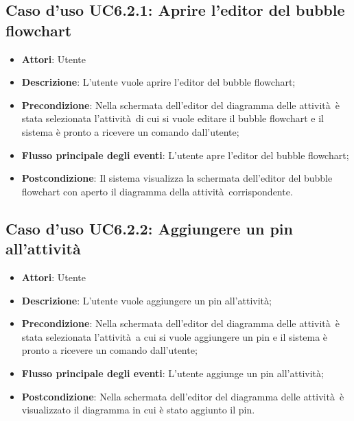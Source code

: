 \documentclass[../AnalisiDeiRequisiti.tex]{subfiles}
\begin{document}
				\subsection{Caso d'uso UC6.2.1: Aprire l'editor del bubble flowchart}
				\begin{itemize}
					\item \textbf{Attori}: Utente
					\item \textbf{Descrizione}: L'utente vuole aprire l'editor del bubble flowchart; 
					\item \textbf{Precondizione}: Nella schermata dell'editor del diagramma delle attività è stata selezionata l'attività di cui si vuole editare il bubble flowchart e il sistema è pronto a ricevere un comando dall'utente;
					\item \textbf{Flusso principale degli eventi}: L'utente apre l'editor del bubble flowchart;
					\item \textbf{Postcondizione}: Il sistema visualizza la schermata dell'editor del bubble flowchart con aperto il diagramma della attività corrispondente.
				\end{itemize}
				\subsection{Caso d'uso UC6.2.2: Aggiungere un pin all'attività}
				\begin{itemize}
					\item \textbf{Attori}: Utente
					\item \textbf{Descrizione}: L'utente vuole aggiungere un pin all'attività;
					\item \textbf{Precondizione}: Nella schermata dell'editor del diagramma delle attività è stata selezionata l'attività a cui si vuole aggiungere un pin e il sistema è pronto a ricevere un comando dall'utente;
					\item \textbf{Flusso principale degli eventi}: L'utente aggiunge un pin all'attività;
					\item \textbf{Postcondizione}: Nella schermata dell'editor del diagramma delle attività è visualizzato il diagramma in cui è stato aggiunto il pin.
				\end{itemize}
\end{document}
